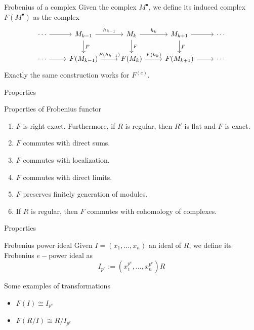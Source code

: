 \documentclass{beamer}
\begin{document}
\begin{frame}[fragile]{}
\begin{block}{Frobenius of a complex}
  Given the complex $M^{\bullet}$, we define its induced complex $F(M^{\bullet})$ as the complex
\[\begin{tikzcd}
	\cdots & {M_{k-1}} & {M_{k}} & {M_{k+1}} & \cdots \\
	\cdots & {F(M_{k-1})} & {F(M_{k})} & {F(M_{k+1})} & \cdots
	\arrow["F", from=1-2, to=2-2]
	\arrow["F", from=1-3, to=2-3]
	\arrow["F", from=1-4, to=2-4]
	\arrow["{h_{k-1}}", from=1-2, to=1-3]
	\arrow["{h_k}", from=1-3, to=1-4]
	\arrow["{F(h_{k-1})}", from=2-2, to=2-3]
	\arrow["{F(h_k)}", from=2-3, to=2-4]
	\arrow[from=1-1, to=1-2]
	\arrow[from=1-4, to=1-5]
	\arrow[from=2-4, to=2-5]
	\arrow[from=2-1, to=2-2]
\end{tikzcd}\]
Exactly the same construction works for $F ^{(e)}$.
\end{block}
\end{frame}



\begin{frame}[fragile]{Properties}
\begin{block}{Properties of Frobenius functor}
\begin{enumerate}
  \item $F$ is right exact. Furthermore, if $R$ is regular, then $R'$ is flat and  $F$ is exact.
  \item $F$ commutes with direct sums.
  \item $F$ commutes with localization.
  \item $F$ commutes with direct limits. 
  \item $F$ preserves finitely generation of modules.
  \item If $R$ is regular, then $F$ commutes with cohomology of complexes.
\end{enumerate}
\end{block}
\end{frame}



\begin{frame}[fragile]{Properties}
\begin{block}{Frobenius power ideal}
 Given  $I = (x_1, \ldots, x_n)$ an ideal of $R$, we define its Frobenius $e-$power ideal as
   \[
	 I _{p^e} := (x_1^{p^e}, \ldots, x_n ^{p^e})R
  \] 
\end{block}
\begin{block}{Some examples of transformations}
  \begin{itemize}
	\item $F(I) \cong I_{p^e}$
	\item $F(R / I)\cong R / I_{p^e}$
  \end{itemize}
\end{block}
\end{frame}
\end{document}
